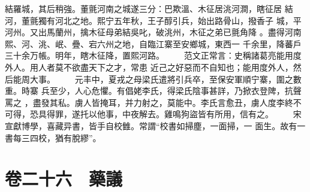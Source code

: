 \documentclass{ctexart}
\begin{document}
結羅城，其后稍強。董氈河南之城遂三分：巴欺溫、木征居洮河澗，瞎征居 結河，董氈獨有河北之地。熙宁五年秋，王子醇引兵，始出路骨山，撥香子 城，平河州。又出馬蘭州，擒木征母弟結吳叱，破洮州，木征之弟已氈角降 。盡得河南熙、河、洮、岷、疊、宕六州之地，自臨江寨至安鄉城，東西一 千余里，降蕃戶三十余万帳。明年，瞎木征降，置熙河路。 　　范文正常言：史稱諸葛亮能用度外人。用人者莫不欲盡天下之才，常患 近己之好惡而不自知也；能用度外人，然后能周大事。 　　元丰中，夏戎之母梁氏遣將引兵卒，至保安軍順宁寨，圍之數重。時寨 兵至少，人心危懼。有倡姥李氏，得梁氏陰事甚詳，乃掀衣登陴，抗聲罵之 ，盡發其私。虜人皆掩耳，并力射之，莫能中。李氏言愈丑，虜人度李終不 可得，恐具得罪，遂托以他事，中夜解去。雞鳴狗盜皆有所用，信有之。 　　宋宣獻博學，喜藏异書，皆手自校雔。常謂``校書如掃塵，一面掃，一 面生。故有一書每三四校，猶有脫繆''。
\clearpage
\section{卷二十六　藥議}
\end{document}
